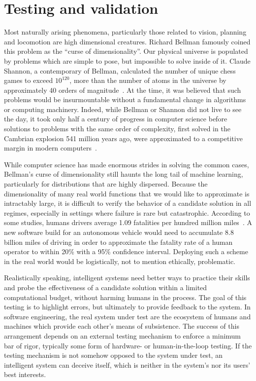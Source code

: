 \documentclass[12pt,initial,twoside,maitrise]{dms}
\numberwithin{equation}{section}
\numberwithin{table}{chapter}
\numberwithin{figure}{chapter}
\begin{document}
\section{Testing and validation}

Most naturally arising phenomena, particularly those related to vision, planning and locomotion are high dimensional creatures. Richard Bellman famously coined this problem as the ``curse of dimensionality''. Our physical universe is populated by problems which are simple to pose, but impossible to solve inside of it. Claude Shannon, a contemporary of Bellman, calculated the number of unique chess games to exceed $10^{120}$, more than the number of atoms in the universe by approximately 40 orders of magnitude~\citep{shannon1950xxii}. At the time, it was believed that such problems would be insurmountable without a fundamental change in algorithms or computing machinery. Indeed, while Bellman or Shannon did not live to see the day, it took only half a century of progress in computer science before solutions to problems with the same order of complexity, first solved in the Cambrian explosion 541 million years ago, were approximated to a competitive margin in modern computers~\citep{pratt2015cambrian}.

While computer science has made enormous strides in solving the common cases, Bellman's curse of dimensionality still haunts the long tail of machine learning, particularly for distributions that are highly dispersed. Because the dimensionality of many real world functions that we would like to approximate is intractably large, it is difficult to verify the behavior of a candidate solution in all regimes, especially in settings where failure is rare but catastrophic. According to some studies, humans drivers average 1.09 fatalities per hundred million miles~\citep{kalra2016driving}. A new software build for an autonomous vehicle would need to accumulate 8.8 billion miles of driving in order to approximate the fatality rate of a human operator to within 20\% with a 95\% confidence interval. Deploying such a scheme in the real world would be logistically, not to mention ethically, problematic.

Realistically speaking, intelligent systems need better ways to practice their skills and probe the effectiveness of a candidate solution within a limited computational budget, without harming humans in the process. The goal of this testing is to highlight errors, but ultimately to provide feedback to the system. In software engineering, the real system under test are the ecosystem of humans and machines which provide each other's means of subsistence. The success of this arrangement depends on an external testing mechanism to enforce a minimum bar of rigor, typically some form of hardware- or human-in-the-loop testing. If the testing mechanism is not somehow opposed to the system under test, an intelligent system can deceive itself, which is neither in the system's nor its users' best interests.
\end{document}

